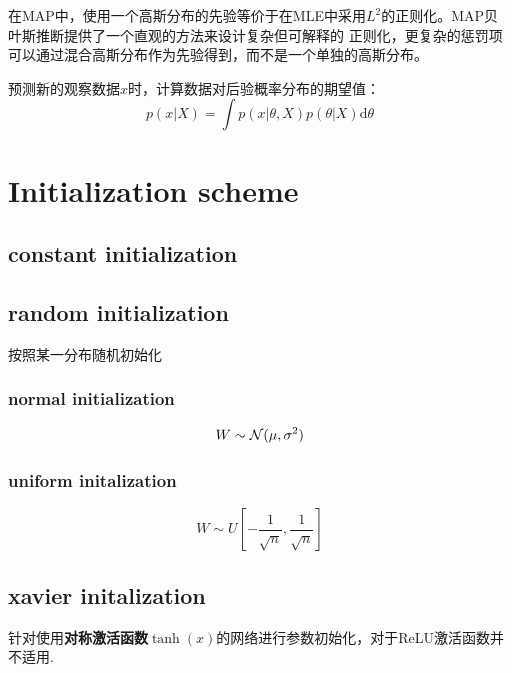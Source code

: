 在MAP中，使用一个高斯分布的先验等价于在MLE中采用$L^2$的正则化。MAP贝叶斯推断提供了一个直观的方法来设计复杂但可解释的
正则化，更复杂的惩罚项可以通过混合高斯分布作为先验得到，而不是一个单独的高斯分布。


预测新的观察数据$x$时，计算数据对后验概率分布的期望值：
\begin{equation}
    p(x|X) = \int p(x | \theta, X)p(\theta|X)\mathrm{d}\theta
\end{equation}
\section{Initialization scheme}
\subsection{constant initialization}

\subsection{random initialization}
按照某一分布随机初始化
\subsubsection{normal initialization}
\begin{equation}
    W \sim \mathcal{N}(\mu, \sigma^2)
\end{equation}

\subsubsection{uniform initalization}
\begin{equation}
    W \sim U[-\frac{1}{\sqrt{n}}, \frac{1}{\sqrt{n}}]
\end{equation}

\subsection{xavier initalization}
针对使用\textbf{对称激活函数}$\tanh(x)$的网络进行参数初始化，对于ReLU激活函数并不适用\cite{Glorot2010}.

